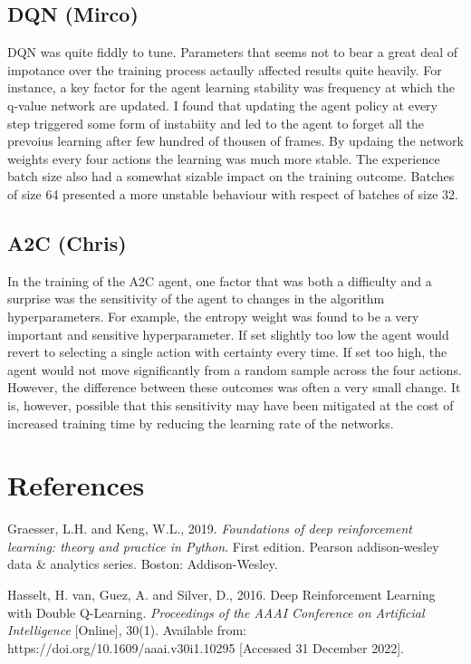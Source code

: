 \documentclass{article}
\begin{document}
\subsection{DQN (Mirco)}
DQN was quite fiddly to tune. Parameters that seems not to bear a great deal of impotance over the training process actaully affected results quite heavily. For instance, a key factor for the agent learning stability was frequency at which the q-value network are updated. I found that updating the agent policy at every step triggered some form of instabiity and led to the agent to forget all the prevoius learning after few hundred of thousen of frames. By updaing the network weights every four actions the learning was much more stable. The experience batch size also had a somewhat sizable impact on the training outcome. Batches of size 64 presented a more unstable behaviour with  respect of batches of size 32.  

\subsection{A2C (Chris)}

In the training of the A2C agent, one factor that was both a difficulty and a surprise was the sensitivity of the agent to changes in the algorithm hyperparameters. For example, the entropy weight was found to be a very important and sensitive hyperparameter. If set slightly too low the agent would revert to selecting a single action with certainty every time. If set too high, the agent would not move significantly from a random sample across the four actions. However, the difference between these outcomes was often a very small change. It is, however, possible that this sensitivity may have been mitigated at the cost of increased training time by reducing the learning rate of the networks.

\section*{References}

Graesser, L.H. and Keng, W.L., 2019. \emph{Foundations of deep reinforcement learning: theory and practice in Python}. First edition. Pearson addison-wesley data \& analytics series. Boston: Addison-Wesley.

Hasselt, H. van, Guez, A. and Silver, D., 2016. Deep Reinforcement Learning with Double Q-Learning. \emph{Proceedings of the AAAI Conference on Artificial Intelligence} [Online], 30(1). Available from: https://doi.org/10.1609/aaai.v30i1.10295 [Accessed 31 December 2022].
\end{document}
